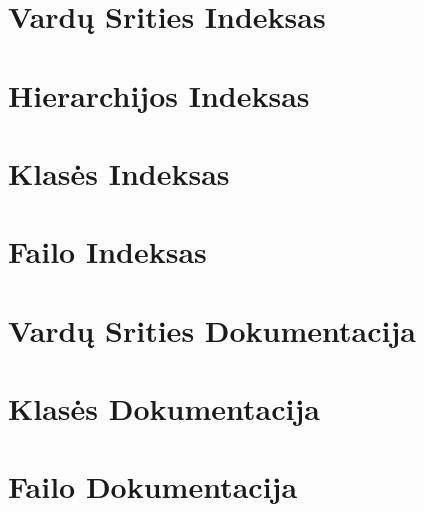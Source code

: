 \documentclass{report}
\newcommand{\+}{}
\begin{document}

\chapter{Vardų Srities Indeksas}

\chapter{Hierarchijos Indeksas}

\chapter{Klasės Indeksas}

\chapter{Failo Indeksas}

\chapter{Vardų Srities Dokumentacija}

\chapter{Klasės Dokumentacija}



\chapter{Failo Dokumentacija}






  \backmatter
  \newpage
  \clearemptydoublepage
  \printindex
\end{document}

